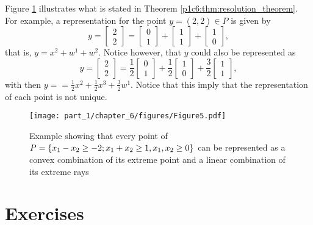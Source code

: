 Figure \ref{p1c6:fig:resolution_example} illustrates what is stated in Theorem \ref{p1c6:thm:resolution_theorem}. For example,  a representation for the point $y = (2,2) \in P$ is given by
%
\begin{equation*}
	y = \begin{bmatrix} 2 \\ 2
		\end{bmatrix}= \begin{bmatrix} 0 \\ 1
		\end{bmatrix} + \begin{bmatrix} 1 \\ 1
		\end{bmatrix} + \begin{bmatrix} 1 \\ 0
		\end{bmatrix}, 	
\end{equation*}
%
that is, $y = x^2 + w^1 + w^2$. Notice however, that $y$ could also be represented as 
%
\begin{equation*}
	y = \begin{bmatrix} 2 \\ 2
		\end{bmatrix}= \frac{1}{2}\begin{bmatrix} 0 \\ 1
		\end{bmatrix} + \frac{1}{2}\begin{bmatrix} 1 \\ 0
		\end{bmatrix} + \frac{3}{2}\begin{bmatrix} 1 \\ 1
		\end{bmatrix}, 	
\end{equation*}
%
with then $y = = \frac{1}{2}x^2 + \frac{1}{2}x^3 + \frac{3}{2}w^1$. Notice that this imply that the representation of each point is not unique.

\begin{figure}[h]
	\texttt{[image: part\_1/chapter\_6/figures/Figure5.pdf]}
	\caption{Example showing that every point of $P = \left\{ x_1 - x_2 \geq -2; x_1 + x_2 \geq 1, x_1,x_2 \geq 0 \right \}$ can be represented as a convex combination of its extreme point and a linear combination of its extreme rays} \label{p1c6:fig:resolution_example}
\end{figure}

\pagebreak	

\section{Exercises}

